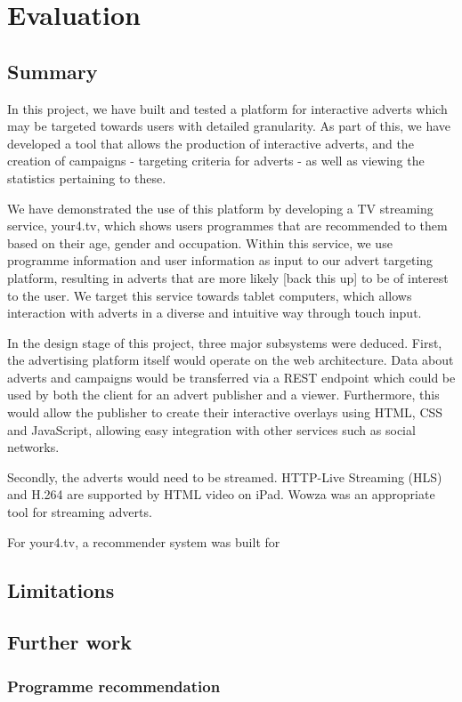 \section{Evaluation}
	\subsection{Summary}
		In this project, we have built and tested a platform for interactive adverts which may be targeted towards users with detailed granularity. As part of this, we have developed a tool that allows the production of interactive adverts, and the creation of campaigns - targeting criteria for adverts - as well as viewing the statistics pertaining to these.

		We have demonstrated the use of this platform by developing a TV streaming service, your4.tv, which shows users programmes that are recommended to them based on their age, gender and occupation. Within this service, we use programme information and user information as input to our advert targeting platform, resulting in adverts that are more likely [back this up] to be of interest to the user. We target this service towards tablet computers, which allows interaction with adverts in a diverse and intuitive way through touch input.

		In the design stage of this project, three major subsystems were deduced. First, the advertising platform itself would operate on the web architecture. Data about adverts and campaigns would be transferred via a REST endpoint which could be used by both the client for an advert publisher and a viewer. Furthermore, this would allow the publisher to create their interactive overlays using HTML, CSS and JavaScript, allowing easy integration with other services such as social networks.

		Secondly, the adverts would need to be streamed. HTTP-Live Streaming (HLS) and H.264 are supported by HTML video on iPad. Wowza was an appropriate tool for streaming adverts.

		For your4.tv, a recommender system was built for 
	\subsection{Limitations}
	\subsection{Further work}
		\subsubsection{Programme recommendation}
		\label{sec:further_work_recommender}


